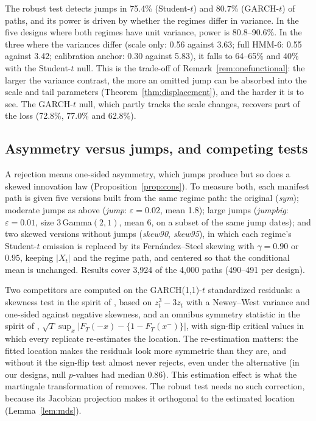 \documentclass[11pt,a4paper]{article}
\theoremstyle{definition}
\theoremstyle{remark}
\begin{document}
The robust test detects jumps in 75.4\% (Student-$t$) and 80.7\% (GARCH-$t$) of paths, and its power is driven by whether the regimes differ in variance. In the five designs where both regimes have unit variance, power is 80.8--90.6\%. In the three where the variances differ (scale only: 0.56 against 3.63; full HMM-6: 0.55 against 3.42; calibration anchor: 0.30 against 5.83), it falls to 64--65\% and 40\% with the Student-$t$ null. This is the trade-off of Remark~\ref{rem:onefunctional}: the larger the variance contrast, the more an omitted jump can be absorbed into the scale and tail parameters (Theorem~\ref{thm:displacement}), and the harder it is to see. The GARCH-$t$ null, which partly tracks the scale changes, recovers part of the loss (72.8\%, 77.0\% and 62.8\%).

\subsection{Asymmetry versus jumps, and competing tests}\label{sec:b12}
A rejection means one-sided asymmetry, which jumps produce but so does a skewed innovation law (Proposition~\ref{prop:cons}). To measure both, each manifest path is given five versions built from the same regime path: the original (\emph{sym}); moderate jumps as above (\emph{jump}: $\varepsilon=0.02$, mean 1.8); large jumps (\emph{jumpbig}: $\varepsilon=0.01$, size $3\,$Gamma$(2,1)$, mean 6, on a subset of the same jump dates); and two skewed versions without jumps (\emph{skew90}, \emph{skew95}), in which each regime's Student-$t$ emission is replaced by its Fern\'andez--Steel skewing \citep{fernandez1998} with $\gamma=0.90$ or $0.95$, keeping $|X_t|$ and the regime path, and centered so that the conditional mean is unchanged. Results cover 3{,}924 of the 4{,}000 paths (490--491 per design).

Two competitors are computed on the GARCH(1,1)-$t$ standardized residuals: a skewness test in the spirit of \citet{bainh2005}, based on $z_t^3-3z_t$ with a Newey--West variance and one-sided against negative skewness, and an omnibus symmetry statistic in the spirit of \citet{bainh2001}, $\sqrt T\sup_x|F_T(-x)-\{1-F_T(x^-)\}|$, with sign-flip critical values in which every replicate re-estimates the location. The re-estimation matters: the fitted location makes the residuals look more symmetric than they are, and without it the sign-flip test almost never rejects, even under the alternative (in our designs, null $p$-values had median 0.86). This estimation effect is what the martingale transformation of \citet{bainh2001} removes. The robust test needs no such correction, because its Jacobian projection makes it orthogonal to the estimated location (Lemma~\ref{lem:mds}).
\end{document}
